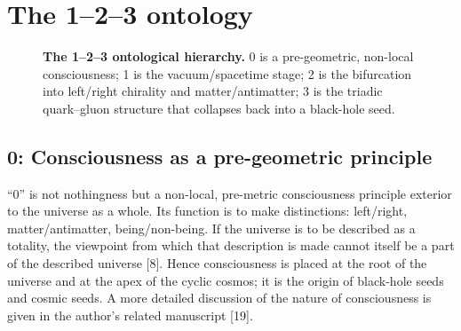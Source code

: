 \documentclass[11pt,a4paper]{article}
\begin{document}
\section{The 1--2--3 ontology}

\begin{figure}[htbp]
\centering
{}
\caption{\textbf{The 1--2--3 ontological hierarchy.} 0 is a pre-geometric, non-local consciousness; 1 is the vacuum/spacetime stage; 2 is the bifurcation into left/right chirality and matter/antimatter; 3 is the triadic quark--gluon structure that collapses back into a black-hole seed.}
\label{fig:ontology}
\end{figure}

\subsection{0: Consciousness as a pre-geometric principle}
``0'' is not nothingness but a non-local, pre-metric consciousness principle exterior to the universe as a whole. Its function is to make distinctions: left/right, matter/antimatter, being/non-being. If the universe is to be described as a totality, the viewpoint from which that description is made cannot itself be a part of the described universe [8]. Hence consciousness is placed at the root of the universe and at the apex of the cyclic cosmos; it is the origin of black-hole seeds and cosmic seeds. A more detailed discussion of the nature of consciousness is given in the author's related manuscript [19].
\end{document}
